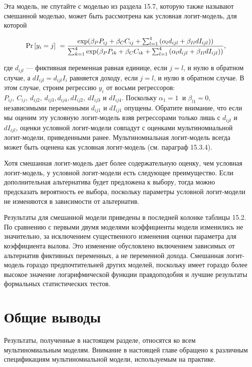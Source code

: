 Эта модель, не спутайте с моделью из раздела 15.7, которую также называют смешанной моделью, может быть рассмотрена как условная логит-модель, для которой

\[{\Pr  \left[y_i=j\right]\ }=
\frac{{\rm exp}({\beta }_PP_{ij}+{\beta }_CC_{ij}+\sum^4_{l=1}{({\alpha }_ld_{ijl}+{\beta }_{Il}dI_{ijl})})}
{\sum^4_{k=1}{{\rm exp}({\beta }_PP_{ik}+{\beta }_CC_{ik}+\sum^4_{l=1}{({\alpha }_ld_{ijl}+{\beta }_{Il}dI_{ijl})})}},\] 

где $d_{ijl}$ --- фиктивная переменная равная единице, если $j=l$, и нулю в обратном случае, а $dI_{ijl}=d_{ijl}I_i$ равняется доходу, если $j=l$, и нулю в обратном случае. В этом случае, строим регрессию $y_i$ от восьми регрессоров: $P_{ij},\ C_{ij},\ d_{ij2},\ d_{ij3},d_{ij4},dI_{ij2},\ dI_{ij3}$ и $dI_{ij4}.$ Поскольку ${\alpha }_1=1\ $ и ${\beta }_{l1}=0$, независимыми переменными $d_{ij1}$ и $dI_{ij1}$ опущены. 
Обратите внимание, что если мы оценим эту условную логит-модель взяв регрессорами только лишь с $d_{ijl}$ и $dI_{ijl}$, оценки условной логит-модели совпадут с оценками мультиномиальной логит-модели, приведенными ранее. Мультиномиальная логит-модель всегда может быть оценена как условная логит-модель (см. параграф 15.3.4).

Хотя смешанная логит-модель дает более содержательную оценку, чем условная логит-модель, у условной логит-модели есть следующее преимущество. Если дополнительная альтернатива будет предложена к выбору, тогда можно предсказать вероятность ее выбора, поскольку параметры условной логит-модели не изменяются в зависимости от альтернатив.

Результаты для смешанной модели приведены в последней колонке таблицы 15.2. По сравнению с первыми двумя моделями коэффициенты модели изменились не значительно, за исключением существенного изменения оценки параметра для коэффициента вылова. Это изменение обусловлено включением зависимых от альтернатив фиктивных переменных, а не переменной дохода. Смешанная логит-модель гораздо предпочтительней других моделей, поскольку имеет гораздо более высокое значение логарифмической функции правдоподобия и лучшие результаты формальных статистических тестов.

\section{ Общие выводы}

Результаты, полученные в настоящем разделе, относятся ко всем мультиномиальным моделям. Внимание в настоящей главе обращено к различным спецификациям мультиномиальной модели, используемым на практике.

